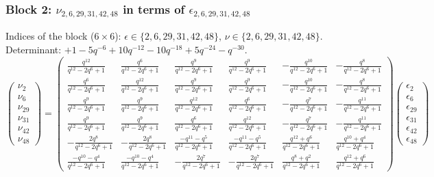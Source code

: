 \subsubsection{Block 2: $\nu_{2, 6, 29, 31, 42, 48}$ in terms of $\epsilon_{2, 6, 29, 31, 42, 48}$}
Indices of the block ($6\times 6$): $\epsilon \in \{2, 6, 29, 31, 42, 48\}$, $\nu \in \{2, 6, 29, 31, 42, 48\}$.
Determinant: $+1-5q^{-6}+10q^{-12}-10q^{-18}+5q^{-24}-q^{-30}$.
\[
\begin{pmatrix}
\nu_{2} \\
\nu_{6} \\
\nu_{29} \\
\nu_{31} \\
\nu_{42} \\
\nu_{48}
\end{pmatrix}
=
\begin{pmatrix}
\frac{q^{12}}{q^{12}-2q^{6}+1} & \frac{q^{6}}{q^{12}-2q^{6}+1} & \frac{q^{9}}{q^{12}-2q^{6}+1} & \frac{q^{9}}{q^{12}-2q^{6}+1} & -\frac{q^{10}}{q^{12}-2q^{6}+1} & -\frac{q^{8}}{q^{12}-2q^{6}+1} \\
\frac{q^{6}}{q^{12}-2q^{6}+1} & \frac{q^{12}}{q^{12}-2q^{6}+1} & \frac{q^{9}}{q^{12}-2q^{6}+1} & \frac{q^{9}}{q^{12}-2q^{6}+1} & -\frac{q^{10}}{q^{12}-2q^{6}+1} & -\frac{q^{8}}{q^{12}-2q^{6}+1} \\
\frac{q^{9}}{q^{12}-2q^{6}+1} & \frac{q^{9}}{q^{12}-2q^{6}+1} & \frac{q^{12}}{q^{12}-2q^{6}+1} & \frac{q^{6}}{q^{12}-2q^{6}+1} & -\frac{q^{7}}{q^{12}-2q^{6}+1} & -\frac{q^{11}}{q^{12}-2q^{6}+1} \\
\frac{q^{9}}{q^{12}-2q^{6}+1} & \frac{q^{9}}{q^{12}-2q^{6}+1} & \frac{q^{6}}{q^{12}-2q^{6}+1} & \frac{q^{12}}{q^{12}-2q^{6}+1} & -\frac{q^{7}}{q^{12}-2q^{6}+1} & -\frac{q^{11}}{q^{12}-2q^{6}+1} \\
-\frac{2q^{8}}{q^{12}-2q^{6}+1} & -\frac{2q^{8}}{q^{12}-2q^{6}+1} & \frac{-q^{11}-q^{5}}{q^{12}-2q^{6}+1} & \frac{-q^{11}-q^{5}}{q^{12}-2q^{6}+1} & \frac{q^{12}+q^{6}}{q^{12}-2q^{6}+1} & \frac{q^{10}+q^{4}}{q^{12}-2q^{6}+1} \\
\frac{-q^{10}-q^{4}}{q^{12}-2q^{6}+1} & \frac{-q^{10}-q^{4}}{q^{12}-2q^{6}+1} & -\frac{2q^{7}}{q^{12}-2q^{6}+1} & -\frac{2q^{7}}{q^{12}-2q^{6}+1} & \frac{q^{8}+q^{2}}{q^{12}-2q^{6}+1} & \frac{q^{12}+q^{6}}{q^{12}-2q^{6}+1}
\end{pmatrix}
\begin{pmatrix}
\epsilon_{2} \\
\epsilon_{6} \\
\epsilon_{29} \\
\epsilon_{31} \\
\epsilon_{42} \\
\epsilon_{48}
\end{pmatrix}
\]

